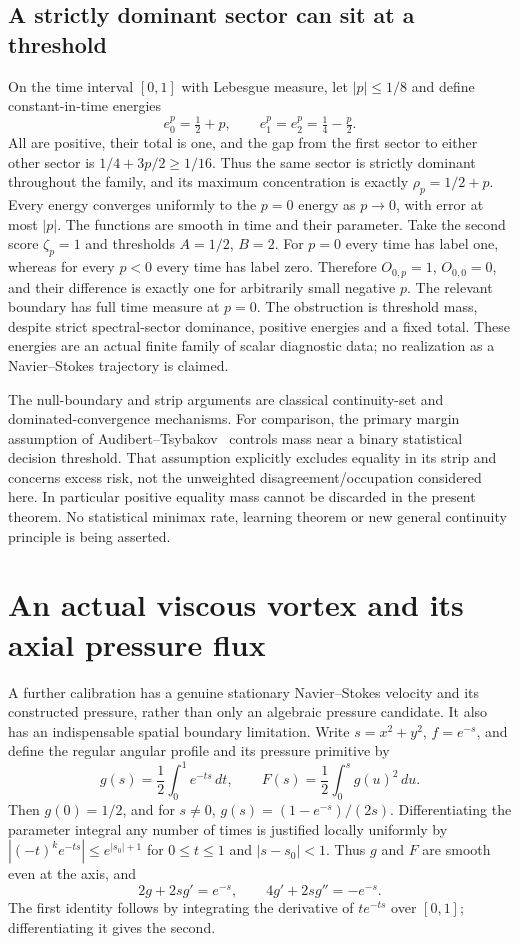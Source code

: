 \documentclass[11pt]{article}
\begin{document}
\subsection{A strictly dominant sector can sit at a threshold}
On the time interval $[0,1]$ with Lebesgue measure, let $|p|\leq1/8$
and define constant-in-time energies
\[
 e_0^p=\tfrac12+p,\qquad e_1^p=e_2^p=\tfrac14-\tfrac p2.
\]
All are positive, their total is one, and the gap from the first
sector to either other sector is $1/4+3p/2\geq1/16$. Thus the
same sector is strictly dominant throughout the family, and its
maximum concentration is exactly $\rho_p=1/2+p$. Every energy
converges uniformly to the $p=0$ energy as $p\to0$, with error
at most $|p|$. The functions are smooth in time and their parameter.
Take the second score $\zeta_p=1$ and thresholds $A=1/2$, $B=2$.
For $p=0$ every time has label one, whereas for every $p<0$ every
time has label zero. Therefore $O_{0,p}=1$, $O_{0,0}=0$, and
their difference is exactly one for arbitrarily small negative $p$.
The relevant boundary has full time measure at $p=0$.
The obstruction is threshold mass, despite strict spectral-sector
dominance, positive energies and a fixed total. These energies are
an actual finite family of scalar diagnostic data; no realization
as a Navier--Stokes trajectory is claimed.

The null-boundary and strip arguments are classical continuity-set
and dominated-convergence mechanisms. For comparison, the primary
margin assumption of Audibert--Tsybakov~\cite{AT} controls mass near
a binary statistical decision threshold. That assumption explicitly
excludes equality in its strip and concerns excess risk, not the
unweighted disagreement/occupation considered here. In particular
positive equality mass cannot be discarded in the present theorem.
No statistical minimax rate, learning theorem or new general
continuity principle is being asserted.


\section{An actual viscous vortex and its axial pressure flux}
A further calibration has a genuine stationary Navier--Stokes velocity
and its constructed pressure, rather than only an algebraic pressure
candidate. It also has an indispensable spatial boundary limitation.
Write $s=x^2+y^2$, $f=e^{-s}$, and define the regular angular profile
and its pressure primitive by
\begin{equation}\label{eq:swirlprofile}
 g(s)=\frac12\int_0^1e^{-ts}\,dt,\qquad
 F(s)=\frac12\int_0^s g(u)^2\,du.
\end{equation}
Then $g(0)=1/2$, and for $s\ne0$,
$g(s)=(1-e^{-s})/(2s)$. Differentiating the parameter integral any
number of times is justified locally uniformly by
$|(-t)^k e^{-ts}|\le e^{|s_0|+1}$ for $0\le t\le1$ and
$|s-s_0|<1$. Thus $g$ and $F$ are smooth even at the axis, and
\begin{equation}\label{eq:swirlidentities}
 2g+2sg'=e^{-s},\qquad4g'+2sg''=-e^{-s}.
\end{equation}
The first identity follows by integrating the derivative of
$te^{-ts}$ over $[0,1]$; differentiating it gives the second.
\end{document}
